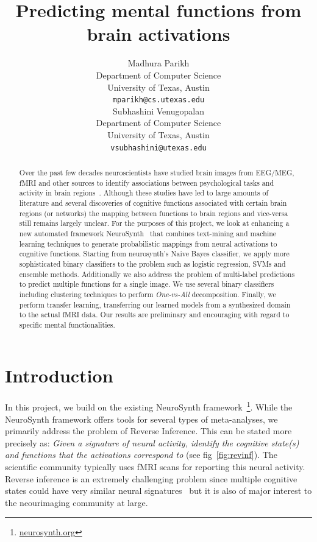 \documentclass{article} %
\title{Predicting mental functions from brain activations}
\author{
Madhura Parikh\\
Department of Computer Science\\
University of Texas, Austin\\
\texttt{mparikh@cs.utexas.edu} \\
\And
Subhashini Venugopalan \\
Department of Computer Science\\
University of Texas, Austin\\
\texttt{vsubhashini@utexas.edu} \\
}
\begin{document}
\maketitle

\begin{abstract}
Over the past few decades neuroscientists have studied brain images from EEG/MEG, fMRI and other sources to identify associations between psychological tasks and activity in brain regions~\cite{PMSKBY12}.
Although these studies have led to large amounts of literature and several discoveries of cognitive functions associated with certain brain regions (or networks) the mapping between functions to brain regions and vice-versa still remains largely unclear. For the purposes of this project, we look at enhancing a new automated framework NeuroSynth~\cite{yarkoni2011large}  that combines text-mining and machine learning techniques to generate probabilistic mappings from neural activations to cognitive functions. Starting from neurosynth's Naive Bayes classifier, we apply more sophisticated binary classifiers to the problem such as logistic regression, SVMs and ensemble methods. Additionally we also address the problem of multi-label predictions to predict multiple functions for a single image. We use several binary classifiers including clustering techniques to perform \textit{One-vs-All} decomposition. Finally, we perform transfer learning, transferring our learned models from a synthesized domain to the actual fMRI data. Our results are preliminary and encouraging with regard to specific mental functionalities.
\end{abstract}

\section{Introduction}
In this project, we build on the existing NeuroSynth framework~\footnote{\protect \url{neurosynth.org}}. While the NeuroSynth framework offers tools for several types of meta-analyses, we primarily address the problem of Reverse Inference.  This can be stated more precisely as: \emph{Given a signature of neural activity,  identify  the cognitive state(s) and functions that the activations correspond to} (see fig~\ref{fig:revinf}). The scientific community typically uses fMRI scans for reporting this neural activity. Reverse inference is an extremely challenging problem since multiple cognitive states could have very similar neural signatures~\cite{yarkoni2011large} but it is also of major interest to the neourimaging community at large.
\end{document}
